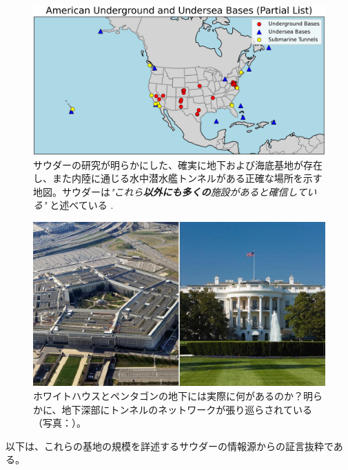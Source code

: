 \documentclass[10pt,twocolumn,letterpaper]{article}
\begin{document}
\begin{figure}[t]
\begin{center}
\includegraphics[width=1\textwidth]{basescrop.png}
\end{center}
   \caption{サウダーの研究が明らかにした、確実に地下および海底基地が存在し、また内陸に通じる水中潜水艦トンネルがある正確な場所を示す地図。サウダーは\textit{"これら\textbf{以外にも多くの}施設があると確信している"} と述べている \cite{22}.}
   \label{fig:4}
\end{figure}

\begin{figure}[t]
\begin{center}
   \includegraphics[width=1\linewidth]{penta.jpg}
\end{center}
   \caption{ホワイトハウスとペンタゴンの地下には実際に何があるのか？明らかに、地下深部にトンネルのネットワークが張り巡らされている（写真：\cite{31}）。}
\label{fig:3}
\label{fig:onecol}
\end{figure}

以下は、これらの基地の規模を詳述するサウダーの情報源からの証言抜粋である。
\end{document}
